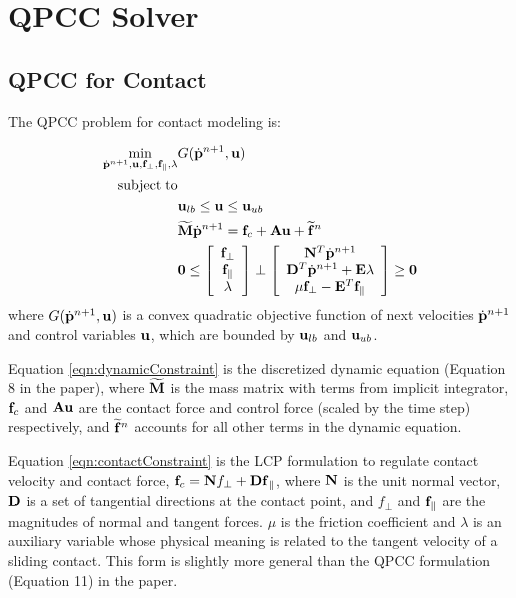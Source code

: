 \chapter{QPCC Solver}
\label{chapter:AppendixA}

\section{QPCC for Contact}

The QPCC problem for contact modeling is:

\begin{align}
\label{eqn:optimization}
 \min_{\dot{\mathbf{p}}^{n+1}, \mathbf{u},\mathbf{f}_\perp,\mathbf{f}_\parallel,\lambda}& G(\dot{\mathbf{p}}^{n+1}, \mathbf{u})  \\
\nonumber  \mathrm{subject\;} \mathrm{to} &\\
\nonumber &\mathbf{u}_{lb} \leq \mathbf{u} \leq \mathbf{u}_{ub}\\
\label{eqn:dynamicConstraint} &\widetilde{\mathbf{M}}\dot{\mathbf{p}}^{n+1} = \mathbf{f}_c + \mathbf{A}\mathbf{u} + \widetilde{\mathbf{f}}^n\\
\label{eqn:contactConstraint} &\mathbf{0} \leq \left[ \begin{array}{c} \mathbf{f}_\perp \\ \mathbf{f}_\parallel \\ \lambda \end{array} \right] \perp
 \left[ \begin{array}{c} \mathbf{N}^T\dot{\mathbf{p}}^{n+1} \\ \mathbf{D}^T \dot{\mathbf{p}}^{n+1} + \mathbf{E} \lambda \\ \mu \mathbf{f}_\perp - \mathbf{E}^T \mathbf{f}_\parallel \end{array} \right] \geq \mathbf{0}
\end{align}
where $G(\dot{\mathbf{p}}^{n+1}, \mathbf{u})$ is a convex quadratic objective function of next velocities $\dot{\mathbf{p}}^{n+1}$ and control variables $\mathbf{u}$, which are bounded by $\mathbf{u}_{lb}$ and $\mathbf{u}_{ub}$.

Equation \ref{eqn:dynamicConstraint} is the discretized dynamic equation (Equation 8 in the paper), where $\widetilde{\mathbf{M}}$ is the mass matrix with terms from implicit integrator, $\mathbf{f}_c$ and $\mathbf{Au}$ are the contact force and control force (scaled by the time step) respectively, and $\widetilde{\mathbf{f}}^n$ accounts for all other terms in the dynamic equation.

Equation \ref{eqn:contactConstraint} is the LCP formulation to regulate contact velocity and contact force, $\mathbf{f}_c=\mathbf{N}f_{\perp}+\mathbf{Df}_{\parallel}$, where $\mathbf{N}$ is the unit normal vector, $\mathbf{D}$ is a set of tangential directions at the contact point, and $f_{\perp}$ and $\mathbf{f}_{\parallel}$ are the magnitudes of normal and tangent forces. $\mu$ is the friction coefficient and $\lambda$ is an auxiliary variable whose physical meaning is related to the tangent velocity of a sliding contact. This form is slightly more general than the QPCC formulation (Equation 11) in the paper.

